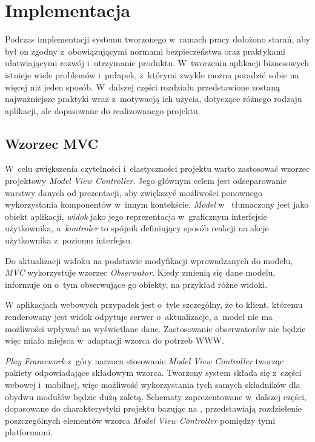 \documentclass[11pt]{aghdpl}
\begin{document}

\chapter{Implementacja}
\label{cha:implementacja}

Podczas implementacji systemu tworzonego w~ramach pracy dołożono starań, aby był on zgodny z~obowiązującymi normami bezpieczeństwa oraz praktykami ułatwiającymi rozwój i~utrzymanie produktu. W~tworzeniu aplikacji biznesowych istnieje wiele problemów i~pułapek, z~którymi zwykle można poradzić sobie na więcej niż jeden sposób. W~dalszej części rozdziału przedstawione zostaną najważniejsze praktyki wraz z~motywacją ich użycia, dotyczące różnego rodzaju aplikacji, ale dopasowane do realizowanego projektu.

\section{Wzorzec MVC}
\label{sec:wzorzecMVC}

W~celu zwiększenia czytelności i~elastyczności projektu warto zastosować wzorzec projektowy \emph{Model View Controller}. Jego głównym celem jest odseparowanie warstwy danych od prezentacji, aby zwiększyć możliwości ponownego wykorzystania komponentów w~innym kontekście. \emph{Model} w~\cite{GoF} tłumaczony jest jako obiekt aplikacji, \emph{widok} jako jego reprezentacja w~graficznym interfejsie użytkownika, a~\emph{kontroler} to spójnik definiujący sposób reakcji na akcje użytkownika z~poziomu interfejsu.

Do aktualizacji widoku na podstawie modyfikacji wprowadzanych do modelu, \emph{MVC} wykorzystuje wzorzec \emph{Obserwator}. Kiedy zmienią się dane modelu, informuje on o~tym obserwujące go obiekty, na przykład różne widoki.

W aplikacjach webowych przypadek jest o~tyle szczególny, że to klient, któremu renderowany jest widok odpytuje serwer o~aktualizacje, a~model nie ma możliwości wpływać na wyświetlane dane. Zastosowanie obserwatorów nie będzie więc miało miejsca w~adaptacji wzorca do potrzeb WWW.

\emph{Play Framework} z~góry narzuca stosowanie \emph{Model View Controller} tworząc pakiety odpowiadające składowym wzorca. Tworzony system składa się z~części webowej i~mobilnej, więc możliwość wykorzystania tych samych składników dla obydwu modułów będzie dużą zaletą. Schematy zaprezentowane w~dalszej części, dopasowane do charakterystyki projektu bazując na \cite{PfMC}, przedstawiają rozdzielenie poszczególnych elementów wzorca \emph{Model View Controller} pomiędzy tymi platformami.
\end{document}
